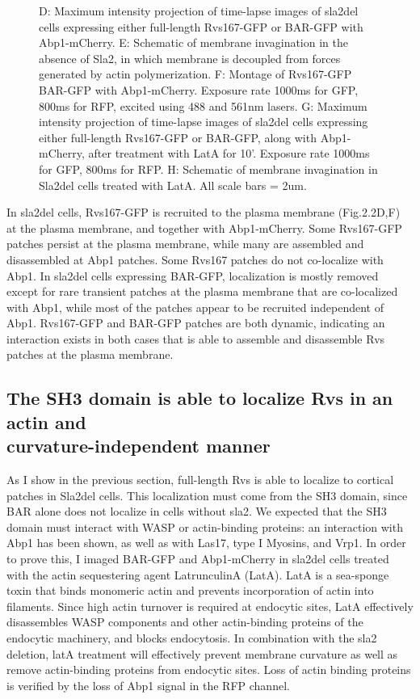\begin{figure}
{	D: Maximum intensity projection of time-lapse images of sla2del cells expressing either full-length Rvs167-GFP or BAR-GFP with Abp1-mCherry. 
	E: Schematic of membrane invagination in the absence of Sla2, in which membrane is decoupled from forces generated by actin polymerization. F: Montage of Rvs167-GFP BAR-GFP with Abp1-mCherry. Exposure rate 1000ms for GFP, 800ms for RFP, excited using 488 and 561nm lasers. 
	G: Maximum intensity projection of time-lapse images of sla2del cells expressing either full-length Rvs167-GFP or BAR-GFP, along with Abp1-mCherry, after treatment with LatA for 10’. Exposure rate 1000ms for GFP, 800ms for RFP. H: Schematic of membrane invagination in Sla2del cells treated with LatA. 
	All scale bars = 2um.
	\label{fig2_sla2del}}
	\end{figure}

	\vspace{5mm}
In sla2del cells, Rvs167-GFP is recruited to the plasma membrane (Fig.2.2D,F) at the plasma membrane, and together with Abp1-mCherry. Some Rvs167-GFP patches persist at the plasma membrane, while many are assembled and disassembled at Abp1 patches. Some Rvs167 patches do not co-localize with Abp1. In sla2del cells expressing BAR-GFP, localization is mostly removed except for rare transient patches at the plasma membrane that are co-localized with Abp1, while most of the patches appear to be recruited independent of Abp1. Rvs167-GFP and BAR-GFP patches are both dynamic, indicating an interaction exists in both cases that is able to assemble and disassemble Rvs patches at the plasma membrane. 

	\subsection{The SH3 domain is able to localize Rvs in an 
		actin and \\ curvature-independent manner}

	As I show in the previous section, full-length Rvs is able to localize to cortical patches in Sla2del cells. This localization must come from the SH3 domain, since BAR alone does not localize in cells without sla2. We expected that the SH3 domain must interact with WASP or actin-binding proteins: an interaction with Abp1 has been shown, as well as with Las17, type I Myosins, and Vrp1. In order to prove this, I imaged BAR-GFP and Abp1-mCherry in sla2del cells treated with the actin sequestering agent LatrunculinA (LatA). LatA is a sea-sponge toxin that binds monomeric actin and prevents incorporation of actin into filaments. Since high actin turnover is required at endocytic sites, LatA effectively disassembles WASP components and other actin-binding proteins of the endocytic machinery, and blocks endocytosis. In combination with the sla2 deletion, latA treatment will effectively prevent membrane curvature as well as remove actin-binding proteins from endocytic sites. Loss of actin binding proteins is verified by the loss of Abp1 signal in the RFP channel.


